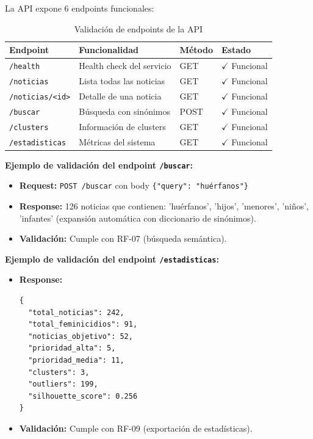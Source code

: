 La API expone 6 endpoints funcionales:

\begin{table}[h]
\centering
\caption{Validación de endpoints de la API}
\label{tab:endpoints_api}
\begin{tabular}{|l|p{4cm}|l|l|}
\hline
\textbf{Endpoint} & \textbf{Funcionalidad} & \textbf{Método} & \textbf{Estado} \\ \hline
\texttt{/health} & Health check del servicio & GET & $\checkmark$ Funcional \\ \hline
\texttt{/noticias} & Lista todas las noticias & GET & $\checkmark$ Funcional \\ \hline
\texttt{/noticias/<id>} & Detalle de una noticia & GET & $\checkmark$ Funcional \\ \hline
\texttt{/buscar} & Búsqueda con sinónimos & POST & $\checkmark$ Funcional \\ \hline
\texttt{/clusters} & Información de clusters & GET & $\checkmark$ Funcional \\ \hline
\texttt{/estadisticas} & Métricas del sistema & GET & $\checkmark$ Funcional \\ \hline
\end{tabular}
\end{table}

\textbf{Ejemplo de validación del endpoint \texttt{/buscar}:}

\begin{itemize}
    \item \textbf{Request:} \texttt{POST /buscar} con body \texttt{\{"query": "huérfanos"\}}
    \item \textbf{Response:} 126 noticias que contienen: 'huérfanos', 'hijos', 'menores', 'niños', 'infantes' (expansión automática con diccionario de sinónimos).
    \item \textbf{Validación:} Cumple con RF-07 (búsqueda semántica).
\end{itemize}

\textbf{Ejemplo de validación del endpoint \texttt{/estadisticas}:}

\begin{itemize}
    \item \textbf{Response:}
    \begin{verbatim}
{
  "total_noticias": 242,
  "total_feminicidios": 91,
  "noticias_objetivo": 52,
  "prioridad_alta": 5,
  "prioridad_media": 11,
  "clusters": 3,
  "outliers": 199,
  "silhouette_score": 0.256
}
    \end{verbatim}
    \item \textbf{Validación:} Cumple con RF-09 (exportación de estadísticas).
\end{itemize}


